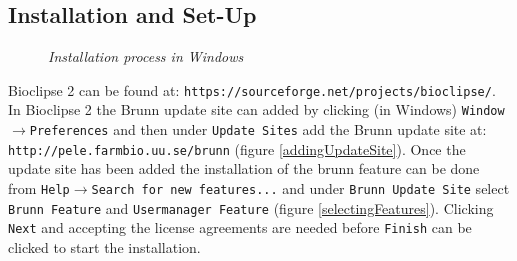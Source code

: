 \documentclass[a4paper,10pt]{article}
\begin{document}
         \subsection{Installation and Set-Up}

         \begin{figure}
           \caption{\textit{Installation process in Windows}} 
         \end{figure}

            Bioclipse 2 can be found at:
            \texttt{https://sourceforge.net/projects/bioclipse/}. In Bioclipse
            2 the Brunn update site can added by clicking (in Windows)
            \texttt{Window$\rightarrow$Preferences} and then under
            \texttt{Update Sites} add the Brunn update site at:
            \texttt{http://pele.farmbio.uu.se/brunn} (figure
            \ref{addingUpdateSite}). Once the update site has been added the
            installation of the brunn feature can be done from
            \texttt{Help$\rightarrow$Search for new features...} and under
            \texttt{Brunn Update Site} select \texttt{Brunn Feature} and
            \texttt{Usermanager Feature} (figure \ref{selectingFeatures}).
            Clicking \texttt{Next} and accepting the license agreements are
            needed before \texttt{Finish} can be clicked to start the
            installation. 
\end{document}
